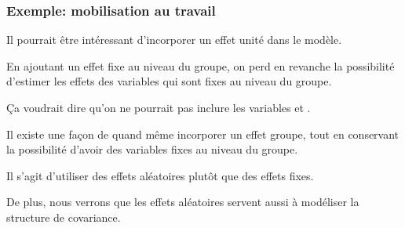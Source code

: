 \documentclass{beamer}
\begin{document}
\begin{frame}[fragile]
\frametitle{Exemple: mobilisation au travail}
\bi
\item Il pourrait être intéressant d'incorporer un effet unité dans le modèle.
\item En ajoutant un effet fixe au niveau du groupe, on perd en revanche la possibilité d'estimer les effets des variables qui sont fixes au niveau du groupe.
\item Ça voudrait dire qu'on ne pourrait pas inclure les variables  et .
\item Il existe une façon de quand même incorporer un effet groupe, tout en conservant la possibilité d'avoir des variables fixes au niveau du groupe.
\item Il s'agit d'utiliser des \alert{effets aléatoires} plutôt que des effets fixes.
\item De plus, nous verrons que les effets aléatoires servent aussi à modéliser la structure de covariance.
\ei
\end{frame}
\end{document}
